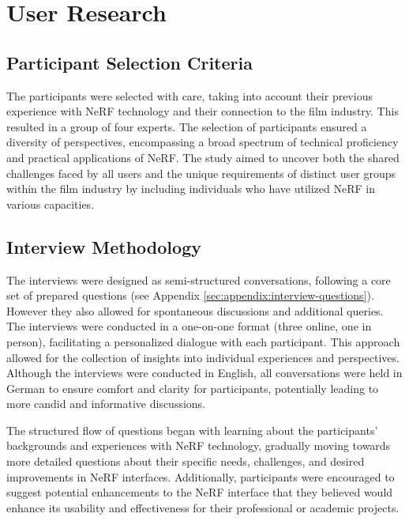 %
\chapter{User Research}
\label{sec:user-research}

\section{Participant Selection Criteria}
\label{sec:user-research:criteria}

The participants were selected with care, taking into account their previous experience with NeRF technology and their connection to the film industry. 
This resulted in a group of four experts. 
The selection of participants ensured a diversity of perspectives, encompassing a broad spectrum of technical proficiency and practical applications of NeRF. 
The study aimed to uncover both the shared challenges faced by all users and the unique requirements of distinct user groups within the film industry by including individuals who have utilized NeRF in various capacities.

\section{Interview Methodology}
\label{sec:user-research:interview}

The interviews were designed as semi-structured conversations, following a core set of prepared questions (see Appendix \ref{sec:appendix:interview-questions}).
However they also allowed for spontaneous discussions and additional queries. 
The interviews were conducted in a one-on-one format (three online, one in person), facilitating a personalized dialogue with each participant. This approach allowed for the collection of insights into individual experiences and perspectives. 
Although the interviews were conducted in English, all conversations were held in German to ensure comfort and clarity for participants, potentially leading to more candid and informative discussions.

The structured flow of questions began with learning about the participants' backgrounds and experiences with NeRF technology, gradually moving towards more detailed questions about their specific needs, challenges, and desired improvements in NeRF interfaces. 
Additionally, participants were encouraged to suggest potential enhancements to the NeRF interface that they believed would enhance its usability and effectiveness for their professional or academic projects.

